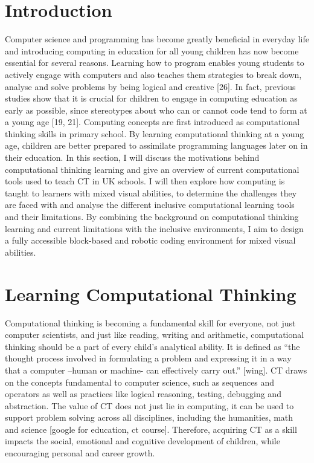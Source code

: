 \documentclass[oneside,%
                    author={Malak Hajji},
                    degree={BSc},
                    title={Designing An Accessible Computational Toolkit For Students},
                  subtitle={With Mixed Visual Abilities}]{dissertation}
\begin{document}
\section{Introduction}

Computer science and programming has become greatly beneficial in everyday life and introducing computing in education for all young children has now become essential for several reasons. Learning how to program enables young students to actively engage with computers and also teaches them strategies to break down, analyse and solve problems by being logical and creative [26]. In fact, previous studies show that it is crucial for children to engage in computing education as early as possible, since stereotypes about who can or cannot code tend to form at a young age [19, 21]. 
Computing concepts are first introduced as computational thinking skills in primary school. By learning computational thinking at a young age, children are better prepared to assimilate programming languages later on in their education. 
In this section, I will discuss the motivations behind computational thinking learning and give an overview of current computational tools used to teach CT in UK schools. I will then explore how computing is taught to learners with mixed visual abilities, to determine the challenges they are faced with and analyse the different inclusive computational learning tools and their limitations. By combining the background on computational thinking learning and current limitations with the inclusive environments, I aim to design a fully accessible block-based and robotic coding environment for mixed visual abilities.

\section{Learning Computational Thinking}  

Computational thinking is becoming a fundamental skill for everyone, not just computer scientists, and just like reading, writing and arithmetic, computational thinking should be a part of every child’s analytical ability. It is defined as “the thought process involved in formulating a problem and expressing it in a way that a computer –human or machine- can effectively carry out.” [wing]. CT draws on the concepts fundamental to computer science, such as sequences and operators as well as practices like logical reasoning, testing, debugging and abstraction. The value of CT does not just lie in computing, it can be used to support problem solving across all disciplines, including the humanities, math and science [google for education, ct course]. Therefore, acquiring CT as a skill impacts the social, emotional and cognitive development of children, while encouraging personal and career growth.
\end{document}
